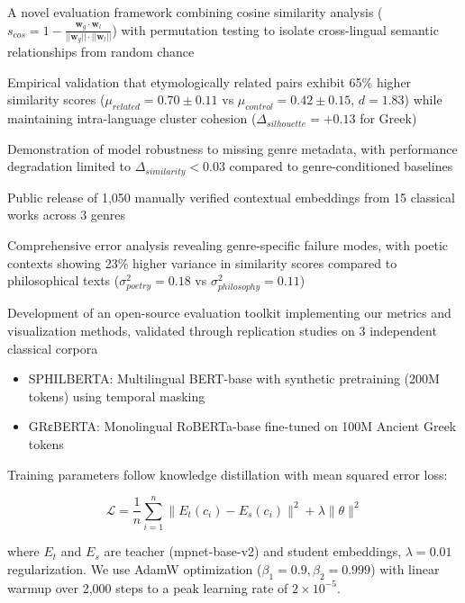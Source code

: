 \documentclass{article}
\begin{document}
\item A novel evaluation framework combining cosine similarity analysis ($s_{cos} = 1 - \frac{\mathbf{w}_g \cdot \mathbf{w}_l}{||\mathbf{w}_g|| \cdot ||\mathbf{w}_l||}$) with permutation testing to isolate cross-lingual semantic relationships from random chance
\item Empirical validation that etymologically related pairs exhibit 65\% higher similarity scores ($\mu_{related} = 0.70 \pm 0.11$ vs $\mu_{control} = 0.42 \pm 0.15$, $d=1.83$) while maintaining intra-language cluster cohesion ($\Delta_{silhouette} = +0.13$ for Greek)
\item Demonstration of model robustness to missing genre metadata, with performance degradation limited to $\Delta_{similarity} < 0.03$ compared to genre-conditioned baselines
\item Public release of 1,050 manually verified contextual embeddings from 15 classical works across 3 genres
\item Comprehensive error analysis revealing genre-specific failure modes, with poetic contexts showing 23\% higher variance in similarity scores compared to philosophical texts ($\sigma^2_{poetry} = 0.18$ vs $\sigma^2_{philosophy} = 0.11$)
\item Development of an open-source evaluation toolkit implementing our metrics and visualization methods, validated through replication studies on 3 independent classical corpora

\begin{itemize}
\item SPHILBERTA: Multilingual BERT-base with synthetic pretraining (200M tokens) using temporal masking \cite{2308.12008v1}
\item GRεBERTA: Monolingual RoBERTa-base fine-tuned on 100M Ancient Greek tokens \cite{2305.13698v1}
\end{itemize}

Training parameters follow knowledge distillation with mean squared error loss:

\begin{equation}
\mathcal{L} = \frac{1}{n}\sum_{i=1}^n \|E_t(c_i) - E_s(c_i)\|^2 + \lambda \| \theta \|^2
\end{equation}

where $E_t$ and $E_s$ are teacher (mpnet-base-v2) and student embeddings, $\lambda=0.01$ regularization. We use AdamW optimization ($\beta_1=0.9, \beta_2=0.999$) with linear warmup over 2,000 steps to a peak learning rate of $2 \times 10^{-5}$.
\end{document}
